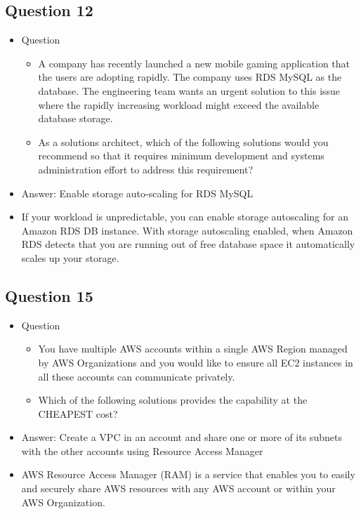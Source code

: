 \documentclass[]{scrartcl}
\begin{document}
\subsection{Question 12}
\begin{itemize}
	\item Question
	\begin{itemize}
		\item A company has recently launched a new mobile gaming application that the users are adopting rapidly. The company uses RDS MySQL as the database. The engineering team wants an urgent solution to this issue where the rapidly increasing workload might exceed the available database storage.
		\item As a solutions architect, which of the following solutions would you recommend so that it requires minimum development and systems administration effort to address this requirement?
	\end{itemize}
	\item Answer: Enable storage auto-scaling for RDS MySQL
	\item If your workload is unpredictable, you can enable storage autoscaling for an Amazon RDS DB instance. With storage autoscaling enabled, when Amazon RDS detects that you are running out of free database space it automatically scales up your storage. 
\end{itemize}

\subsection{Question 15}
\begin{itemize}
	\item Question
	\begin{itemize}
		\item You have multiple AWS accounts within a single AWS Region managed by AWS Organizations and you would like to ensure all EC2 instances in all these accounts can communicate privately. 
		\item Which of the following solutions provides the capability at the CHEAPEST cost?
	\end{itemize}
	\item Answer: Create a VPC in an account and share one or more of its subnets with the other accounts using Resource Access Manager
	\item AWS Resource Access Manager (RAM) is a service that enables you to easily and securely share AWS resources with any AWS account or within your AWS Organization. 
\end{itemize}
\end{document}
